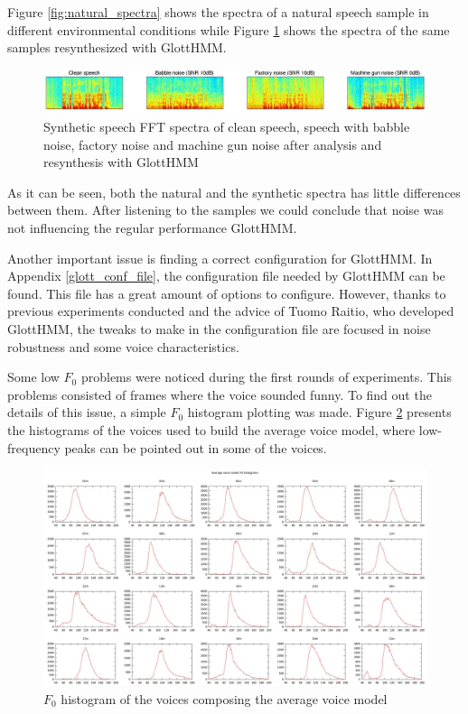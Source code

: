 Figure \ref{fig:natural_spectra} shows the spectra of a natural speech sample in different environmental conditions while Figure \ref{fig:synthetic_spectra} shows the spectra of the same samples resynthesized with GlottHMM.

\begin{figure}[!htb]
\begin{centering}
\includegraphics[width=\textwidth]{images/synthetic_spectra.jpg}
\caption{Synthetic speech FFT spectra of clean speech, speech with babble noise, factory noise and machine gun noise after analysis and resynthesis with GlottHMM}
\label{fig:synthetic_spectra}
\end{centering}
\end{figure}

As it can be seen, both the natural and the synthetic spectra has little differences between them.
%
%
After listening to the samples we could conclude that noise was not influencing the regular performance GlottHMM.

Another important issue is finding a correct configuration for GlottHMM.
%
In Appendix \ref{glott_conf_file}, the configuration file needed by GlottHMM can be found.
%
This file has a great amount of options to configure. 
%
However, thanks to previous experiments conducted and the advice of Tuomo Raitio, who developed GlottHMM, the tweaks to make in the configuration file are focused in noise robustness and some voice characteristics.

Some low $F_{0}$ problems were noticed during the first rounds of experiments.
% 
This problems consisted of frames where the voice sounded funny.
%
To find out the details of this issue, a simple $F_{0}$ histogram plotting was made.
%
Figure \ref{fig:f0_histograms} presents the histograms of the voices used to build the average voice model, where low-frequency peaks can be pointed out in some of the voices.

\begin{figure}[!htb]
\begin{centering}
\includegraphics[width=\textwidth]{images/av_model_=conf_f0_histogram.jpg}
\caption{$F_{0}$ histogram of the voices composing the average voice model}
\label{fig:f0_histograms}
\end{centering}
\end{figure}

